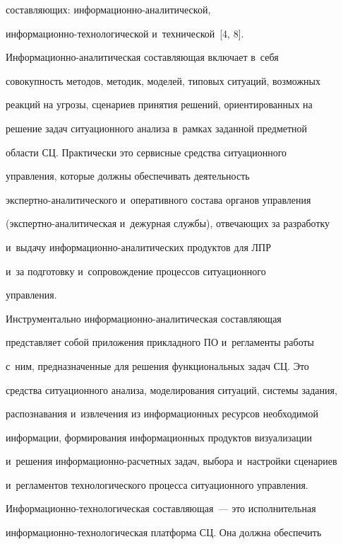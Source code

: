 составляющих: ин\-фор\-ма\-ци\-он\-но-ана\-ли\-ти\-че\-ской,

 ин\-фор\-ма\-ци\-он\-но-тех\-но\-ло\-ги\-че\-ской и~технической~[4, 8]. 

    

    Информационно-аналитическая составляющая включает в~себя 

совокупность методов, методик, моделей, типовых ситуаций, возможных 

реакций на угрозы, сценариев принятия решений, ориентированных на 

решение задач ситуационного анализа в~рамках заданной предметной 

области СЦ. Практически это сервисные средства ситуационного 

управления, которые должны обеспечивать деятельность  

экс\-перт\-но-ана\-ли\-ти\-че\-ско\-го и~оперативного состава органов управления 

(экспертно-аналитическая и~дежурная службы), отвечающих за разработку 

и~выдачу ин\-фор\-ма\-ци\-он\-но-ана\-ли\-ти\-че\-ских продуктов для ЛПР 

и~за подготовку и~сопровождение процессов ситуационного 

управления. 

    

    Инструментально информационно-аналитическая составляющая 

представляет собой приложения прикладного ПО и~регламенты работы 

с~ним, предназначенные для решения функциональных задач СЦ. Это 

средства ситуационного анализа, моделирования ситуаций, сис\-те\-мы задания, 

распознавания и~извлечения из информационных ресурсов необходимой 

информации, формирования информационных продуктов визуализации 

и~решения ин\-фор\-ма\-ци\-он\-но-рас\-чет\-ных задач, выбора и~настройки сценариев 

и~регламентов технологического процесса ситуационного управления. 

    

    Информационно-технологическая составляющая~--- это исполнительная 

ин\-фор\-ма\-ци\-он\-но-тех\-но\-ло\-ги\-че\-ская платформа СЦ. Она должна обеспечить 

